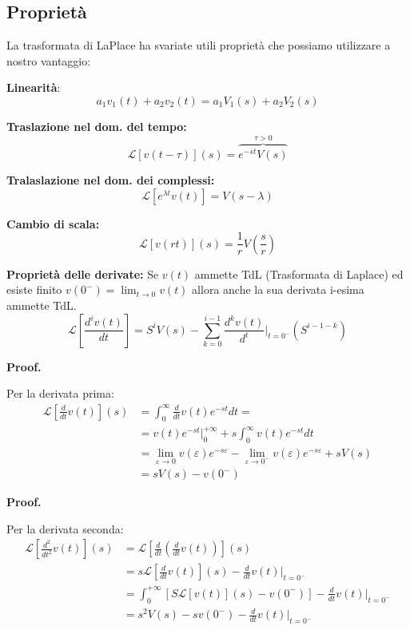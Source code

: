 \documentclass[a4paper]{article}
\newtheorem{property}[theorem]{Propriety}
\theoremstyle{definition}
\theoremstyle{remark}
\renewenvironment{proof}[1][Proof]{%
  \begin{mdframed}[linewidth=0.8pt, roundcorner=5pt, linecolor=black, skipabove=\baselineskip, skipbelow=\baselineskip, innertopmargin=5pt, innerbottommargin=5pt]%
  \noindent\textbf{#1. }%
}{%
  \end{mdframed}%
}
\renewenvironment{property}{\begin{oldproperty}}{\end{oldproperty}}
\begin{document}
\subsection{Proprietà}

La trasformata di LaPlace ha svariate utili proprietà che possiamo utilizzare a nostro vantaggio:
\indent
\begin{property}
\label{prop:linearity_lap}
    \textbf{Linearità}: \[a_1v_1(t) + a_2v_2(t) = a_1V_1(s) + a_2V_2(s)\]
\end{property}
\begin{property}
\label{prop:traslas_time_lap}
    \textbf{Traslazione nel dom. del tempo: } \[\mathcal{L}[v(t-\tau)](s) = \overbrace{e^{-st}V(s)}^{\tau > 0}\]
\end{property}
\begin{property}
\label{prop:traslas_compl_lap}
    \textbf{Tralaslazione nel dom. dei complessi: }
    \[\mathcal{L}[e^{\lambda t}v(t)] = V(s - \lambda)\]
\end{property}
\begin{property}
\label{prop:cambio_di_scala}
    \textbf{Cambio di scala:}
    \[\mathcal{L}[v(rt)](s) = \frac{1}{r}V\left(\frac{s}{r}\right)\]
\end{property}
\begin{property}
\label{prop:derivata_lap}
    \textbf{Proprietà delle derivate:} Se $v(t)$ ammette TdL (Trasformata di Laplace) ed esiste finito $v(0^-) = \lim_{t \rightarrow 0} v(t)$ 
    allora anche la sua derivata i-esima ammette TdL.
    \[\mathcal{L}\left[\frac{d^iv(t)}{dt}\right] = S^iV(s) - \sum_{k = 0}^{i-1} \frac{d^kv(t)}{d^t}\bigg|_{t = 0^-} (S^{i-1-k})\]
\end{property}
\begin{proof}
    Per la derivata prima:
    \begin{align*}
        \mathcal{L}\left[\frac{d}{dt}v(t)\right](s) &= \int_{0}^{\infty} \frac{d}{dt}v(t)e^{-st}dt =\\ 
        &= v(t)e^{-st}\bigg|_0^{+\infty} + s\int_{0}^{\infty}v(t)e^{-st}dt\\
        &= \lim_{\varepsilon \rightarrow 0} v(\varepsilon)e^{-s\varepsilon} - \lim_{\varepsilon \rightarrow 0^-} v(\varepsilon)e^{-s\varepsilon} + sV(s)\\
        &= sV(s) - v(0^-)
    \end{align*}
\end{proof}
\begin{proof}
    Per la derivata seconda:
    \begin{align*}
        \mathcal{L}\left[\frac{d^2}{dt^2}v(t)\right](s) &= \mathcal{L}\left[\frac{d}{dt}\left(\frac{d}{dt}v(t)\right)\right](s)\\  &= s\mathcal{L}\left[\frac{d}{dt}v(t)\right](s) - \frac{d}{dt} v(t)\bigg|_{t = 0^-}\\
        &= \int_{0}^{+\infty} \left[S\mathcal{L}[v(t)](s) - v(0^-)\right] - \frac{d}{dt}v(t)\bigg|_{t = 0^-}\\
        &= s^2V(s) - sv(0^-) - \frac{d}{dt}v(t)\bigg|_{t = 0^-}
    \end{align*}
\end{proof}
\end{document}
